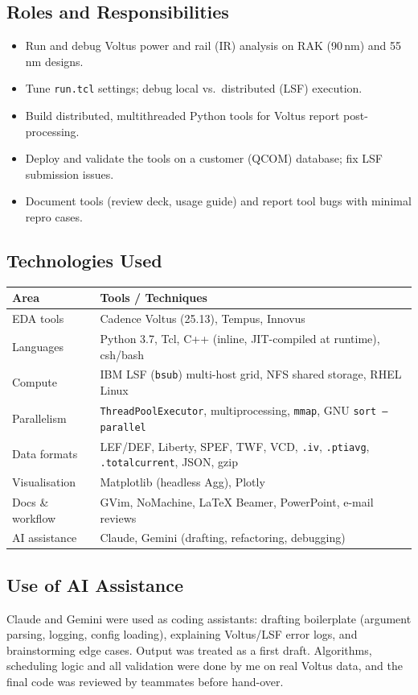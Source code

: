 \documentclass[11pt,a4paper]{article}
\newcommand{\fn}[1]{\texttt{#1}}                 %
\begin{document}
\subsection{Roles and Responsibilities}
\begin{itemize}
  \item Run and debug Voltus power and rail (IR) analysis on RAK (90\,nm) and 55\,nm designs.
  \item Tune \fn{run.tcl} settings; debug local vs.\ distributed (LSF) execution.
  \item Build distributed, multithreaded Python tools for Voltus report post-processing.
  \item Deploy and validate the tools on a customer (QCOM) database; fix LSF submission issues.
  \item Document tools (review deck, usage guide) and report tool bugs with minimal repro cases.
\end{itemize}

\subsection{Technologies Used}
\begin{center}
\begin{tabularx}{0.92\linewidth}{@{}lX@{}}
\toprule
\textbf{Area} & \textbf{Tools / Techniques}\\
\midrule
EDA tools        & Cadence Voltus (25.13), Tempus, Innovus\\
Languages        & Python 3.7, Tcl, C++ (inline, JIT-compiled at runtime), csh/bash\\
Compute          & IBM LSF (\fn{bsub}) multi-host grid, NFS shared storage, RHEL Linux\\
Parallelism      & \fn{ThreadPoolExecutor}, multiprocessing, \fn{mmap}, GNU \fn{sort --parallel}\\
Data formats     & LEF/DEF, Liberty, SPEF, TWF, VCD, \fn{.iv}, \fn{.ptiavg}, \fn{.totalcurrent}, JSON, gzip\\
Visualisation    & Matplotlib (headless Agg), Plotly\\
Docs \& workflow & GVim, NoMachine, LaTeX Beamer, PowerPoint, e-mail reviews\\
AI assistance    & Claude, Gemini (drafting, refactoring, debugging)\\
\bottomrule
\end{tabularx}
\end{center}

\subsection{Use of AI Assistance}
Claude and Gemini were used as coding assistants: drafting boilerplate (argument parsing,
logging, config loading), explaining Voltus/LSF error logs, and brainstorming edge cases.
Output was treated as a first draft. Algorithms, scheduling logic and all validation were
done by me on real Voltus data, and the final code was reviewed by teammates before hand-over.
\end{document}
